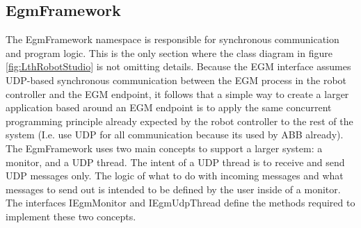 \documentclass{cslthse-msc}
\begin{document}
\subsection{EgmFramework}
\label{sec:Result:LthRobotStudio:EgmFramework}
The EgmFramework namespace is responsible for synchronous communication and program logic. This is the only section where the class diagram in figure \ref{fig:LthRobotStudio} is not omitting details. Because the EGM interface assumes UDP-based synchronous communication between the EGM process in the robot controller and the EGM endpoint, it follows that a simple way to create a larger application based around an EGM endpoint is to apply the same concurrent programming principle already expected by the robot controller to the rest of the system (I.e. use UDP for all communication because its used by ABB already). The EgmFramework uses two main concepts to support a larger system: a monitor, and a UDP thread. The intent of a UDP thread is to receive and send UDP messages only. The logic of what to do with incoming messages and what messages to send out is intended to be defined by the user inside of a monitor. The interfaces IEgmMonitor and IEgmUdpThread define the methods required to implement these two concepts.\par
\end{document}
